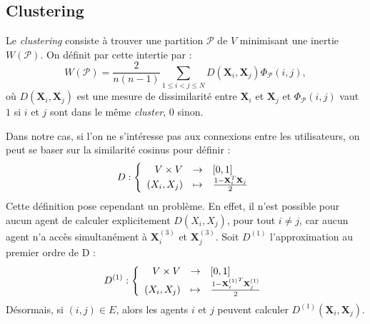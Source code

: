 \documentclass[a4paper]{article}
\begin{document}
\subsection{Clustering}
\label{sub:clustering}
Le \emph{clustering} consiste à trouver une partition $\mathcal{P}$ de $V$ minimisant
une inertie $W(\mathcal{P})$. On définit par cette intertie par :
\[
    W(\mathcal{P}) = \frac{2}{n(n-1)} \sum_{1 \leq i < j \leq N} D(\mathbf{X}_i, \mathbf{X}_j) \Phi_{\mathcal{P}}(i, j),
\]
où $D(\mathbf{X}_i, \mathbf{X}_j)$ est une mesure de dissimilarité entre
$\mathbf{X}_i$ et $\mathbf{X}_j$ et $\Phi_{\mathcal{P}}(i, j)$
vaut $1$ si $i$ et $j$ sont dans le même \emph{cluster}, $0$ sinon.

Dans notre cas, si l'on ne s'intéresse pas aux connexions entre les utilisateurs,
on peut se baser sur la similarité cosinus pour définir :
\[
    D:\left\{
        \begin{array}{r c l}
            V \times V & \rightarrow & [0, 1] \\
            (X_i, X_j) & \mapsto & \frac{1 - \mathbf{X}_i^T \mathbf{X}_j}{2}
        \end{array}
    \right.
\]
Cette définition pose cependant un problème. En effet, il n'est possible pour aucun
agent de calculer explicitement $D(X_i,X_j)$, pour tout $i \neq j$, car aucun agent n'a accès
simultanément à $\mathbf{X}^{(3)}_i$ et $\mathbf{X}^{(3)}_j$. Soit $D^{(1)}$ l'approximation \og{} au
premier ordre \fg de D :
\[
    D^{(1)}:\left\{
        \begin{array}{r c l}
            V \times V & \rightarrow & [0, 1] \\
            (X_i, X_j) & \mapsto & \frac{1 - {\mathbf{X}^{(1)}_i}^T \mathbf{X}^{(1)}_j}{2}
        \end{array}
    \right.
\]
Désormais, si $(i, j) \in E$, alors les agents $i$ et $j$ peuvent calculer
$D^{(1)}(\mathbf{X}_i, \mathbf{X}_j)$.
\end{document}
